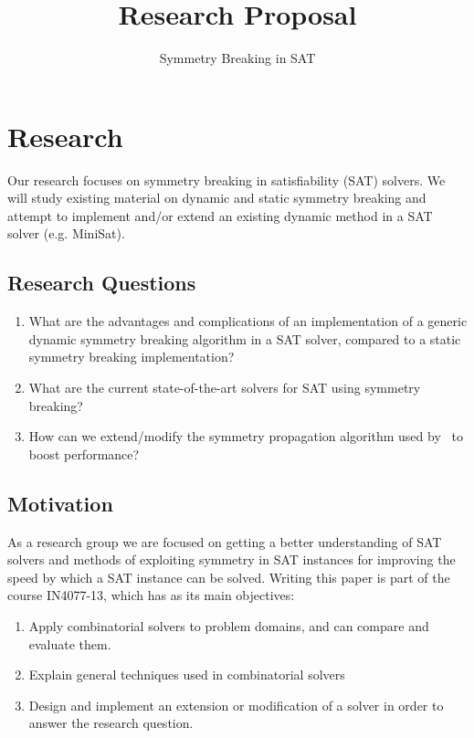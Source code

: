 

	\title{Research Proposal}

	\subtitle{Symmetry Breaking in SAT}



	\maketitle
	\newpage

	\section{Research}
		Our research focuses on symmetry breaking in satisfiability (SAT) solvers. We will study existing material on dynamic and static symmetry breaking and attempt to implement and/or extend an existing dynamic method in a SAT solver (e.g. MiniSat).

		\subsection{Research Questions}
			\begin{enumerate}
				\item What are the advantages and complications of an implementation of a generic dynamic	symmetry breaking algorithm in a SAT solver, compared to a static symmetry breaking implementation?
				\item What are the current state-of-the-art solvers for SAT using symmetry breaking?
				\item How can we extend/modify the symmetry propagation algorithm used by~\cite{devriendt2012symmetry} to boost performance?
			\end{enumerate}

		\subsection{Motivation}
			As a research group we are focused on getting a better understanding of SAT solvers and methods of exploiting symmetry in SAT instances for improving the speed by which a SAT	instance can be solved.	Writing this paper is part of the course IN4077-13, which has as its main objectives:

			\begin{enumerate}
				\item
					Apply combinatorial solvers to problem domains, and can compare and evaluate them.
				\item
					Explain general techniques used in combinatorial solvers
				\item
					Design and implement an extension or modification of a solver in order to answer the research question.
			\end{enumerate}

